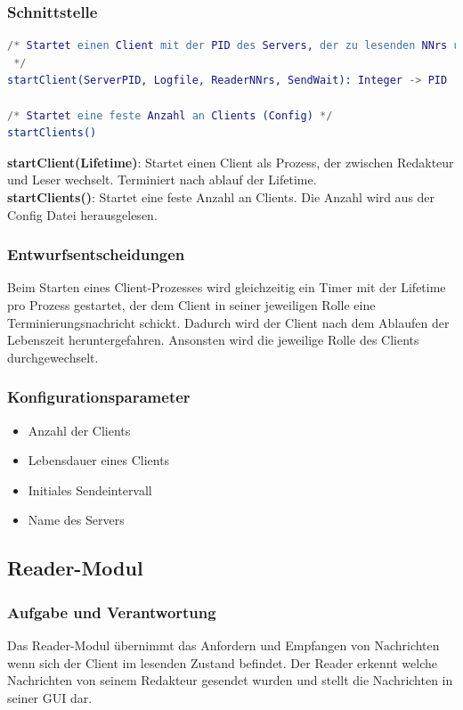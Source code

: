 \documentclass{article}
\begin{document}
\subsubsection{Schnittstelle}
\begin{lstlisting}[language=erlang]
/* Startet einen Client mit der PID des Servers, der zu lesenden NNrs und der Wartezeit zwischen Sendevorgängen, 
 */
startClient(ServerPID, Logfile, ReaderNNrs, SendWait): Integer -> PID

/* Startet eine feste Anzahl an Clients (Config) */
startClients()
\end{lstlisting}

\textbf{startClient(Lifetime)}: Startet einen Client als Prozess, der zwischen Redakteur und Leser wechselt. Terminiert
nach ablauf der Lifetime.\\

\textbf{startClients()}: Startet eine feste Anzahl an Clients. Die Anzahl wird aus der Config Datei herausgelesen.\\

\subsubsection{Entwurfsentscheidungen}
Beim Starten eines Client-Prozesses wird gleichzeitig ein Timer mit der Lifetime pro Prozess gestartet, der dem Client
in seiner jeweiligen Rolle eine Terminierungsnachricht schickt. Dadurch wird der Client nach dem Ablaufen der Lebenszeit
heruntergefahren. Ansonsten wird die jeweilige Rolle des Clients durchgewechselt.

\subsubsection{Konfigurationsparameter}
\begin{itemize}
    \item Anzahl der Clients
    \item Lebensdauer eines Clients
    \item Initiales Sendeintervall
    \item Name des Servers
\end{itemize}

\newpage

\subsection{Reader-Modul}
\subsubsection{Aufgabe und Verantwortung}
Das Reader-Modul übernimmt das Anfordern und Empfangen von Nachrichten wenn sich der Client im lesenden Zustand
befindet. Der Reader erkennt welche Nachrichten von seinem Redakteur gesendet wurden und stellt die Nachrichten in
seiner GUI dar.
\end{document}
